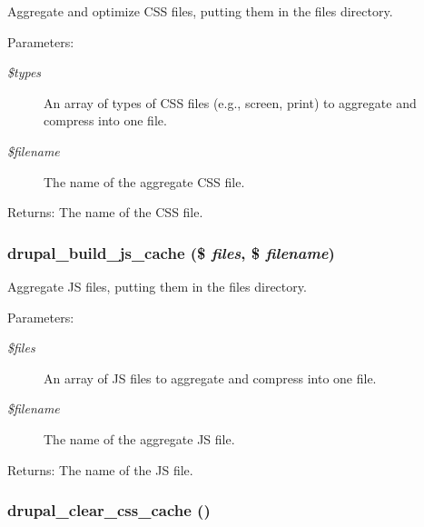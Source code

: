 Aggregate and optimize CSS files, putting them in the files directory.

\begin{Desc}
\item[Parameters:]
\begin{description}
\item[{\em \$types}]An array of types of CSS files (e.g., screen, print) to aggregate and compress into one file. \item[{\em \$filename}]The name of the aggregate CSS file. \end{description}
\end{Desc}
\begin{Desc}
\item[Returns:]The name of the CSS file. \end{Desc}
\hypertarget{common_8inc_1e8a20aeb8dd9bd6e03988936c42feb8}{
\subsubsection[{drupal\_\-build\_\-js\_\-cache}]{\setlength{\rightskip}{0pt plus 5cm}drupal\_\-build\_\-js\_\-cache (\$ {\em files}, \/  \$ {\em filename})}}
\label{common_8inc_1e8a20aeb8dd9bd6e03988936c42feb8}


Aggregate JS files, putting them in the files directory.

\begin{Desc}
\item[Parameters:]
\begin{description}
\item[{\em \$files}]An array of JS files to aggregate and compress into one file. \item[{\em \$filename}]The name of the aggregate JS file. \end{description}
\end{Desc}
\begin{Desc}
\item[Returns:]The name of the JS file. \end{Desc}
\hypertarget{common_8inc_e89dbd2b41a6623be2ed704d039a5c7c}{
\subsubsection[{drupal\_\-clear\_\-css\_\-cache}]{\setlength{\rightskip}{0pt plus 5cm}drupal\_\-clear\_\-css\_\-cache ()}}
\label{common_8inc_e89dbd2b41a6623be2ed704d039a5c7c}


